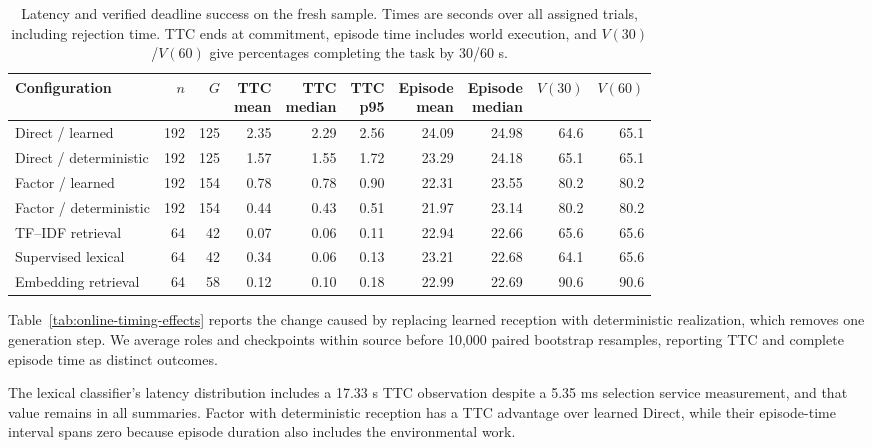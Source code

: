 \documentclass[sigconf,nonacm,balance=false]{aamas}
\newcommand{\tabstyle}{\small\setlength{\tabcolsep}{3pt}\renewcommand{\arraystretch}{1.10}}
\begin{document}
\begin{table}[!htbp]
\centering\tabstyle
\caption{Latency and verified deadline success on the fresh sample. Times are seconds over all assigned trials, including rejection time. TTC ends at commitment, episode time includes world execution, and $V(30)$/$V(60)$ give percentages completing the task by 30/60 s.}
\label{tab:online-latency}
\begin{tabular}{@{}lrrrrrrrrr@{}}
\toprule
Configuration & $n$ & $G$ & \shortstack{TTC\\mean} & \shortstack{TTC\\median} & \shortstack{TTC\\p95} & \shortstack{Episode\\mean} & \shortstack{Episode\\median} & $V(30)$ & $V(60)$\\\midrule
Direct / learned & 192 & 125 & 2.35 & 2.29 & 2.56 & 24.09 & 24.98 & 64.6 & 65.1\\
Direct / deterministic & 192 & 125 & 1.57 & 1.55 & 1.72 & 23.29 & 24.18 & 65.1 & 65.1\\
Factor / learned & 192 & 154 & 0.78 & 0.78 & 0.90 & 22.31 & 23.55 & 80.2 & 80.2\\
Factor / deterministic & 192 & 154 & 0.44 & 0.43 & 0.51 & 21.97 & 23.14 & 80.2 & 80.2\\
TF--IDF retrieval & 64 & 42 & 0.07 & 0.06 & 0.11 & 22.94 & 22.66 & 65.6 & 65.6\\
Supervised lexical & 64 & 42 & 0.34 & 0.06 & 0.13 & 23.21 & 22.68 & 64.1 & 65.6\\
Embedding retrieval & 64 & 58 & 0.12 & 0.10 & 0.18 & 22.99 & 22.69 & 90.6 & 90.6\\
\bottomrule\end{tabular}\end{table}

Table~\ref{tab:online-timing-effects} reports the change caused by replacing learned reception with deterministic realization, which removes one generation step. We average roles and checkpoints within source before 10,000 paired bootstrap resamples, reporting TTC and complete episode time as distinct outcomes.

The lexical classifier's latency distribution includes a 17.33 s TTC observation despite a 5.35 ms selection service measurement, and that value remains in all summaries. Factor with deterministic reception has a TTC advantage over learned Direct, while their episode-time interval spans zero because episode duration also includes the environmental work.
\end{document}
